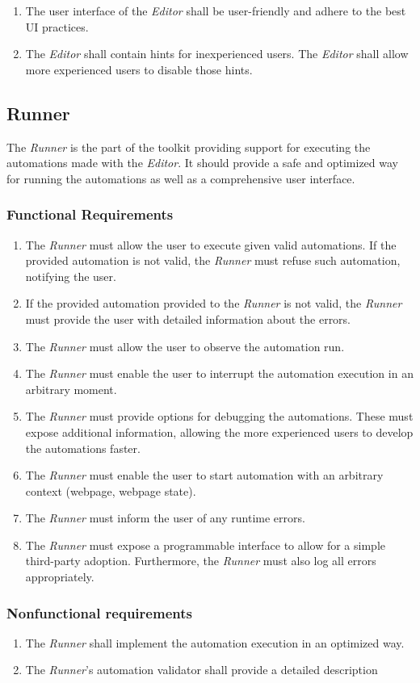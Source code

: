 \begin{enumerate}[label=\thesubsection.2.\arabic*]
    \item The user interface of the \textit{Editor} shall be user-friendly and adhere to the best \ac{UI} practices.
    \item The \textit{Editor} shall contain hints for inexperienced users. 
    The \textit{Editor} shall allow more experienced users to disable those hints.
\end{enumerate}

\subsection{Runner}

The \textit{Runner} is the part of the toolkit providing support for executing the automations made with the \textit{Editor}.
It should provide a safe and optimized way for running the automations as well as a comprehensive user interface.

\subsubsection{Functional Requirements}

\begin{enumerate}[label=\thesubsection.1.\arabic*]
    \item The \textit{Runner} must allow the user to execute given valid automations. 
    If the provided automation is not valid, the \textit{Runner} must refuse such automation, notifying the user.
    \item If the provided automation provided to the \textit{Runner} is not valid, 
    the \textit{Runner} must provide the user with detailed information about the errors.
    \item The \textit{Runner} must allow the user to observe the automation run.
    \item The \textit{Runner} must enable the user to interrupt the automation execution in an arbitrary moment.
    \item The \textit{Runner} must provide options for debugging the automations. 
    These must expose additional information, allowing the more experienced users to develop the automations faster.
    \item The \textit{Runner} must enable the user to start automation with an arbitrary context (webpage, webpage state).
    \item The \textit{Runner} must inform the user of any runtime errors. 
    \item The \textit{Runner} must expose a programmable interface to allow for a simple third-party adoption.
    Furthermore, the \textit{Runner} must also log all errors appropriately.
\end{enumerate}

\subsubsection{Nonfunctional requirements}

\begin{enumerate}[label=\thesubsection.2.\arabic*]
    \item The \textit{Runner} shall implement the automation execution in an optimized way.
    \item The \textit{Runner}'s automation validator shall provide a detailed description
\end{enumerate}
